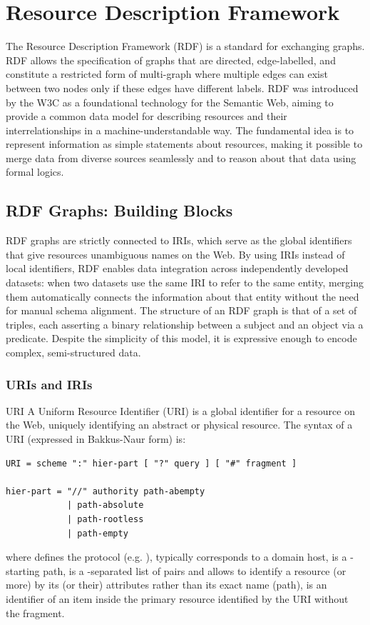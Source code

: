\chapter{Resource Description Framework}
The Resource Description Framework (RDF) is a standard for exchanging graphs. RDF allows the specification of graphs that are directed, edge-labelled, and constitute a restricted form of multi-graph where multiple edges can exist between two nodes only if these edges have different labels. RDF was introduced by the W3C as a foundational technology for the Semantic Web, aiming to provide a common data model for describing resources and their interrelationships in a machine-understandable way. The fundamental idea is to represent information as simple statements about resources, making it possible to merge data from diverse sources seamlessly and to reason about that data using formal logics.

\section{RDF Graphs: Building Blocks}
RDF graphs are strictly connected to IRIs, which serve as the global identifiers that give resources unambiguous names on the Web. By using IRIs instead of local identifiers, RDF enables data integration across independently developed datasets: when two datasets use the same IRI to refer to the same entity, merging them automatically connects the information about that entity without the need for manual schema alignment. The structure of an RDF graph is that of a set of triples, each asserting a binary relationship between a subject and an object via a predicate. Despite the simplicity of this model, it is expressive enough to encode complex, semi-structured data.

\subsection{URIs and IRIs}
\begin{definition}{URI}
    A Uniform Resource Identifier (URI\cite{rfc3986}) is a global identifier for a resource on the Web, uniquely identifying an abstract or physical resource.
    The syntax of a URI (expressed in Bakkus-Naur form) is:
    \begin{lstlisting}
URI = scheme ":" hier-part [ "?" query ] [ "#" fragment ]

hier-part = "//" authority path-abempty
            | path-absolute
            | path-rootless
            | path-empty
    \end{lstlisting}
    where  defines the protocol (e.g. ),  typically corresponds to a domain host,  is a \code{/}-starting path,  is a \code{\&}-separated list of  pairs and allows to identify a resource (or more) by its (or their) attributes rather than its exact name (path),  is an identifier of an item inside the primary resource identified by the URI without the fragment.
\end{definition}

